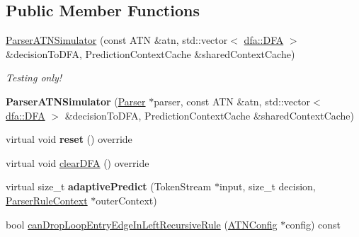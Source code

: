 \subsection*{Public Member Functions}
\begin{DoxyCompactItemize}
\item 
\mbox{\label{classantlr4_1_1atn_1_1ParserATNSimulator_a3a4a291fbbd42c48c1b604b68f52925a}} 
\hyperlink{classantlr4_1_1atn_1_1ParserATNSimulator_a3a4a291fbbd42c48c1b604b68f52925a}{Parser\+A\+T\+N\+Simulator} (const A\+TN \&atn, std\+::vector$<$ \hyperlink{classantlr4_1_1dfa_1_1DFA}{dfa\+::\+D\+FA} $>$ \&decision\+To\+D\+FA, Prediction\+Context\+Cache \&shared\+Context\+Cache)
\begin{DoxyCompactList}\small\item\em Testing only! \end{DoxyCompactList}\item 
\mbox{\label{classantlr4_1_1atn_1_1ParserATNSimulator_aee56c1f43a9dd6385b13aead6021cc3e}} 
{\bfseries Parser\+A\+T\+N\+Simulator} (\hyperlink{classantlr4_1_1Parser}{Parser} $\ast$parser, const A\+TN \&atn, std\+::vector$<$ \hyperlink{classantlr4_1_1dfa_1_1DFA}{dfa\+::\+D\+FA} $>$ \&decision\+To\+D\+FA, Prediction\+Context\+Cache \&shared\+Context\+Cache)
\item 
\mbox{\label{classantlr4_1_1atn_1_1ParserATNSimulator_a05c8564d19c23bdb33d53008d823c387}} 
virtual void {\bfseries reset} () override
\item 
virtual void \hyperlink{classantlr4_1_1atn_1_1ParserATNSimulator_a846da7dc607b212d443cb401f5830bae}{clear\+D\+FA} () override
\item 
\mbox{\label{classantlr4_1_1atn_1_1ParserATNSimulator_a80d4e987d48fc4d0b506184670a8a1e5}} 
virtual size\+\_\+t {\bfseries adaptive\+Predict} (Token\+Stream $\ast$input, size\+\_\+t decision, \hyperlink{classantlr4_1_1ParserRuleContext}{Parser\+Rule\+Context} $\ast$outer\+Context)
\item 
bool \hyperlink{classantlr4_1_1atn_1_1ParserATNSimulator_a3212501674dd0323d4875461304d976c}{can\+Drop\+Loop\+Entry\+Edge\+In\+Left\+Recursive\+Rule} (\hyperlink{classantlr4_1_1atn_1_1ATNConfig}{A\+T\+N\+Config} $\ast$config) const
\item 

\end{DoxyCompactItemize}
